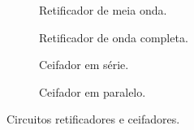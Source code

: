 \begin{figure}[htbp]
    \centering
    \captionsetup[subfigure]{labelformat=simple, labelsep=space}
    \renewcommand{\thesubfigure}{\alph{subfigure})}

    \begin{minipage}{0.8\linewidth}
    \centering
    \begin{subfigure}[t]{0.48\linewidth}
        \centering
        \resizebox{\linewidth}{!}{}
        \caption{Retificador de meia onda.}
        \label{circ:retificador-meia-onda}
    \end{subfigure}\hfill%
    \begin{subfigure}[t]{0.48\linewidth}
        \centering
        \resizebox{\linewidth}{!}{}
        \caption{Retificador de onda completa.}
        \label{circ:retificador-onda-completa}
    \end{subfigure}

    \bigskip
    \begin{subfigure}[t]{0.48\linewidth}
        \centering
        \resizebox{\linewidth}{!}{}
        \caption{Ceifador em série.}
        \label{circ:ceifador-serie}
    \end{subfigure}\hfill%
    \begin{subfigure}[t]{0.48\linewidth}
        \centering
        \resizebox{\linewidth}{!}{}
        \caption{Ceifador em paralelo.}
        \label{circ:ceifador-paralelo}
    \end{subfigure}
    \end{minipage}

    \caption{Circuitos retificadores e ceifadores.}
    \label{fig:circuitos-aula6}
\end{figure}
